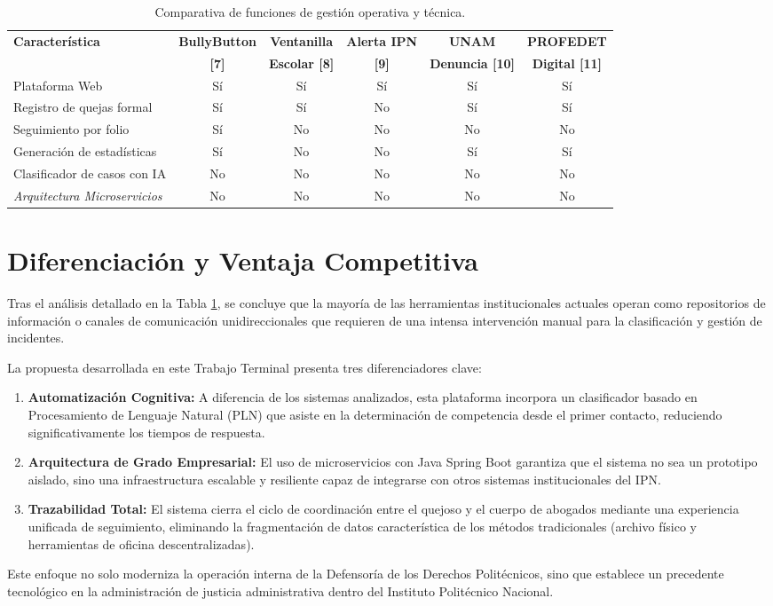 \begin{table}[htbp]
\centering
\small
\begin{tabular}{|p{4cm}|c|c|c|c|c|}
\hline
\textbf{Característica} & \textbf{BullyButton} & \textbf{Ventanilla} & \textbf{Alerta IPN} & \textbf{UNAM} & \textbf{PROFEDET} \\
& \textbf{[7]} & \textbf{Escolar [8]} & \textbf{[9]} & \textbf{Denuncia [10]} & \textbf{Digital [11]} \\ \hline
Plataforma Web & Sí & Sí & Sí & Sí & Sí \\ \hline
Registro de quejas formal & Sí & Sí & No & Sí & Sí \\ \hline
Seguimiento por folio & Sí & No & No & No & No \\ \hline
Generación de estadísticas & Sí & No & No & Sí & Sí \\ \hline
Clasificador de casos con IA & No & No & No & No & No \\ \hline
\textit{Arquitectura Microservicios} & No & No & No & No & No \\ \hline
\end{tabular}
\caption{Comparativa de funciones de gestión operativa y técnica.}
\label{tab:comparativa_estado_arte}
\end{table}

\section{Diferenciación y Ventaja Competitiva}
Tras el análisis detallado en la Tabla \ref{tab:comparativa_estado_arte}, se concluye que la mayoría de las herramientas institucionales actuales operan como repositorios de información o canales de comunicación unidireccionales que requieren de una intensa intervención manual para la clasificación y gestión de incidentes. 

La propuesta desarrollada en este Trabajo Terminal presenta tres diferenciadores clave:

\begin{enumerate}
    \item \textbf{Automatización Cognitiva:} A diferencia de los sistemas analizados, esta plataforma incorpora un clasificador basado en Procesamiento de Lenguaje Natural (PLN) que asiste en la determinación de competencia desde el primer contacto, reduciendo significativamente los tiempos de respuesta.
    \item \textbf{Arquitectura de Grado Empresarial:} El uso de microservicios con Java Spring Boot garantiza que el sistema no sea un prototipo aislado, sino una infraestructura escalable y resiliente capaz de integrarse con otros sistemas institucionales del IPN.
    \item \textbf{Trazabilidad Total:} El sistema cierra el ciclo de coordinación entre el quejoso y el cuerpo de abogados mediante una experiencia unificada de seguimiento, eliminando la fragmentación de datos característica de los métodos tradicionales (archivo físico y herramientas de oficina descentralizadas).
\end{enumerate}

Este enfoque no solo moderniza la operación interna de la Defensoría de los Derechos Politécnicos, sino que establece un precedente tecnológico en la administración de justicia administrativa dentro del Instituto Politécnico Nacional.